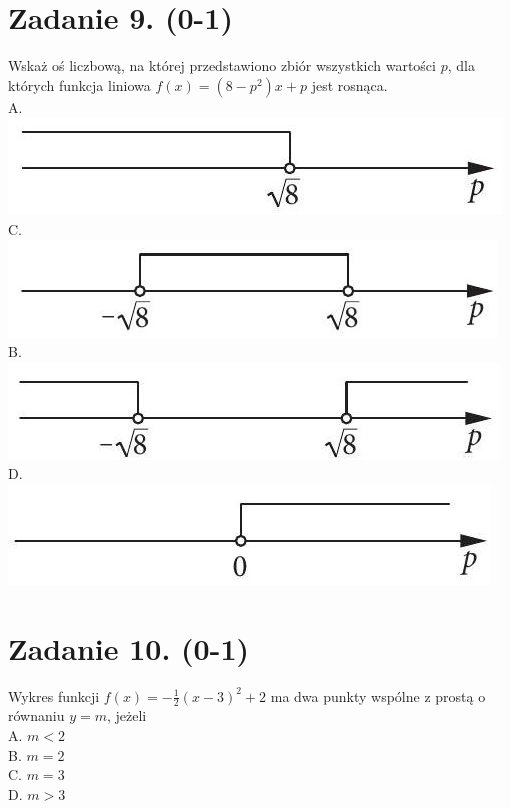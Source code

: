 \documentclass[10pt]{article}
\begin{document}
\section*{Zadanie 9. (0-1)}
Wskaż oś liczbową, na której przedstawiono zbiór wszystkich wartości \(p\), dla których funkcja liniowa \(f(x)=\left(8-p^{2}\right) x+p\) jest rosnąca.\\
A.\\
\includegraphics[max width=\textwidth, center]{2024_11_21_4a1915d79134dda0750eg-04(1)}\\
C.\\
\includegraphics[max width=\textwidth, center]{2024_11_21_4a1915d79134dda0750eg-04(3)}\\
B.\\
\includegraphics[max width=\textwidth, center]{2024_11_21_4a1915d79134dda0750eg-04(2)}\\
D.\\
\includegraphics[max width=\textwidth, center]{2024_11_21_4a1915d79134dda0750eg-04}

\section*{Zadanie 10. (0-1)}
Wykres funkcji \(f(x)=-\frac{1}{2}(x-3)^{2}+2\) ma dwa punkty wspólne z prostą o równaniu \(y=m\), jeżeli\\
A. \(m<2\)\\
B. \(m=2\)\\
C. \(m=3\)\\
D. \(m>3\)
\end{document}

